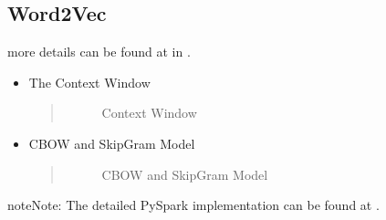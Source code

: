 \documentclass[letterpaper,11pt,english]{sphinxmanual}
\begin{document}
\subsection{Word2Vec}
\label{\detokenize{embedding:word2vec}}
\sphinxAtStartPar
more details can be found at  in  .
\begin{itemize}
\item {} 
\sphinxAtStartPar
The Context Window
\begin{quote}

\begin{figure}[htbp]
\centering
\capstart

\noindent{}
\caption{Context Window}\label{\detokenize{embedding:id4}}\label{\detokenize{embedding:fig-cont-win}}\end{figure}
\end{quote}

\item {} 
\sphinxAtStartPar
CBOW and Skip\sphinxhyphen{}Gram Model
\begin{quote}

\begin{figure}[htbp]
\centering
\capstart

\noindent{}
\caption{CBOW and Skip\sphinxhyphen{}Gram Model}\label{\detokenize{embedding:id5}}\label{\detokenize{embedding:fig-cbow-sgm}}\end{figure}
\end{quote}

\end{itemize}

\begin{sphinxadmonition}{note}{Note:}
\sphinxAtStartPar
The detailed PySpark implementation can be found at .
\end{sphinxadmonition}
\end{document}
